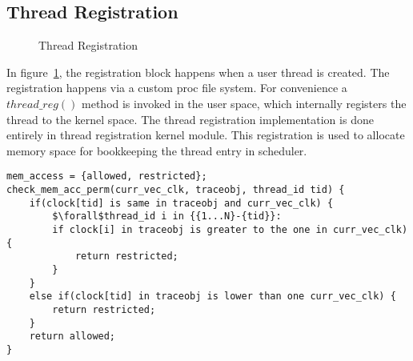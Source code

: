 \subsection{Thread Registration}

\begin{figure}[h]
\centering
{}
\caption{Thread Registration}
\label{thread_reg}
\end{figure}
In figure~\ref{thread_reg}, the registration block happens when a user thread is created. 
The registration happens via a custom proc file system. 
For convenience a $thread\_reg()$ method is invoked in the user space, which internally registers the thread to the kernel space. 
The thread registration implementation is done entirely in thread registration kernel module. 
This registration is used to allocate memory space for bookkeeping the thread entry in scheduler. 
\newpage
\begin{lstlisting}[mathescape=true,style=customc,caption={Pseudo Code for checking memory access permission},frame=tlrb,label={lst:check_perm}]
mem_access = {allowed, restricted};
check_mem_acc_perm(curr_vec_clk, traceobj, thread_id tid) {
	if(clock[tid] is same in traceobj and curr_vec_clk) {
		$\forall$thread_id i in {{1...N}-{tid}}:
		if clock[i] in traceobj is greater to the one in curr_vec_clk) {
			return restricted;		
		}	
	}
	else if(clock[tid] in traceobj is lower than one curr_vec_clk) {
		return restricted;	
	}
	return allowed;
}
\end{lstlisting}



